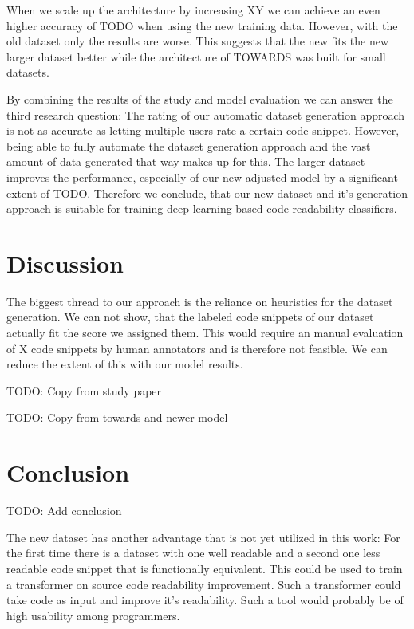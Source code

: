 \documentclass[%
class=scrreprt,
chapterprefix=false,%
open=right,%
twoside=false,%
paper=a4,%
logofile={Logo\_zentral\_farbig\_EN.png},%
thesistype=master,%
UKenglish,%
]{se2thesis}
\begin{document}
	When we scale up the architecture by increasing XY we can achieve an even higher accuracy of TODO when using the new training data. However, with the old dataset only the results are worse. This suggests that the new fits the new larger dataset better while the architecture of TOWARDS was built for small datasets.
	
	By combining the results of the study and model evaluation we can answer the third research question: The rating of our automatic dataset generation approach is not as accurate as letting multiple users rate a certain code snippet. However, being able to fully automate the dataset generation approach and the vast amount of data generated that way makes up for this. The larger dataset improves the performance, especially of our new adjusted model by a significant extent of TODO. Therefore we conclude, that our new dataset and it's generation approach is suitable for training deep learning based code readability classifiers.
	
	\section{Discussion} \label{Discussion}
	The biggest thread to our approach is the reliance on heuristics for the dataset generation. We can not show, that the labeled code snippets of our dataset actually fit the score we assigned them. This would require an manual evaluation of X code snippets by human annotators and is therefore not feasible. We can reduce the extent of this with our model results. 
	
	TODO: Copy from study paper
	
	TODO: Copy from towards and newer model
		
	
	\section{Conclusion} \label{Conclusion}
	TODO: Add conclusion
	
	The new dataset has another advantage that is not yet utilized in this work: For the first time there is a dataset with one well readable and a second one less readable code snippet that is functionally equivalent. This could be used to train a transformer on source code readability improvement. Such a transformer could take code as input and improve it's readability. Such a tool would probably be of high usability among programmers.
	
\end{document}
